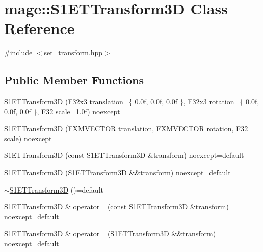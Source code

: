 \hypertarget{classmage_1_1_s1_e_t_transform3_d}{}\section{mage\+:\+:S1\+E\+T\+Transform3D Class Reference}
\label{classmage_1_1_s1_e_t_transform3_d}


{\ttfamily \#include $<$set\+\_\+transform.\+hpp$>$}

\subsection*{Public Member Functions}
\begin{DoxyCompactItemize}
\item 
\mbox{\hyperlink{classmage_1_1_s1_e_t_transform3_d_a0d1dd3a6816cb6593000d26eb6b6eac6}{S1\+E\+T\+Transform3D}} (\mbox{\hyperlink{namespacemage_a1e3c7a882af461f161caa1cbddaf1fa2}{F32x3}} translation=\{ 0.\+0f, 0.\+0f, 0.\+0f \}, F32x3 rotation=\{ 0.\+0f, 0.\+0f, 0.\+0f \}, F32 scale=1.\+0f) noexcept
\item 
\mbox{\hyperlink{classmage_1_1_s1_e_t_transform3_d_a0f96ded7087f2ce8c41525b0ba60cd40}{S1\+E\+T\+Transform3D}} (F\+X\+M\+V\+E\+C\+T\+OR translation, F\+X\+M\+V\+E\+C\+T\+OR rotation, \mbox{\hyperlink{namespacemage_aa97e833b45f06d60a0a9c4fc22ae02c0}{F32}} scale) noexcept
\item 
\mbox{\hyperlink{classmage_1_1_s1_e_t_transform3_d_aeb9cc3fc8fddc9294894c57ceaad3da7}{S1\+E\+T\+Transform3D}} (const \mbox{\hyperlink{classmage_1_1_s1_e_t_transform3_d}{S1\+E\+T\+Transform3D}} \&transform) noexcept=default
\item 
\mbox{\hyperlink{classmage_1_1_s1_e_t_transform3_d_a0e35654ae6a2f2dfc3857d73eafc3f45}{S1\+E\+T\+Transform3D}} (\mbox{\hyperlink{classmage_1_1_s1_e_t_transform3_d}{S1\+E\+T\+Transform3D}} \&\&transform) noexcept=default
\item 
\mbox{\hyperlink{classmage_1_1_s1_e_t_transform3_d_af689e067dee401ee30dadaaed027835e}{$\sim$\+S1\+E\+T\+Transform3D}} ()=default
\item 
\mbox{\hyperlink{classmage_1_1_s1_e_t_transform3_d}{S1\+E\+T\+Transform3D}} \& \mbox{\hyperlink{classmage_1_1_s1_e_t_transform3_d_a71ac2eca4b482b728ba0ad99588a800e}{operator=}} (const \mbox{\hyperlink{classmage_1_1_s1_e_t_transform3_d}{S1\+E\+T\+Transform3D}} \&transform) noexcept=default
\item 
\mbox{\hyperlink{classmage_1_1_s1_e_t_transform3_d}{S1\+E\+T\+Transform3D}} \& \mbox{\hyperlink{classmage_1_1_s1_e_t_transform3_d_a9ce87c509ed1a659037f6a4201946c90}{operator=}} (\mbox{\hyperlink{classmage_1_1_s1_e_t_transform3_d}{S1\+E\+T\+Transform3D}} \&\&transform) noexcept=default

\end{DoxyCompactItemize}
